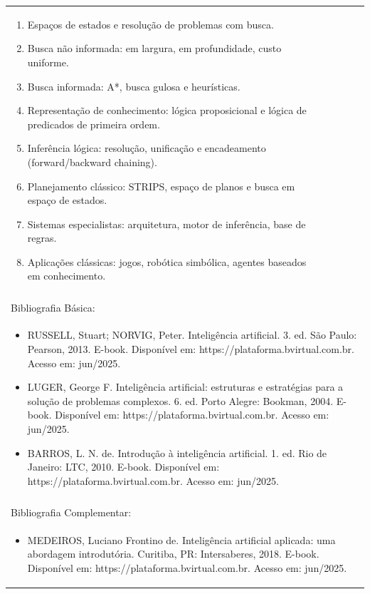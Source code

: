 \documentclass[11pt]{article}
\begin{document}
\begin{center}
\begin{longtable}{|p{4cm}|p{4cm}|p{4cm}|p{4cm}|}
{\begin{enumerate}
\item Espaços de estados e resolução de problemas com busca.
\item Busca não informada: em largura, em profundidade, custo uniforme.
\item Busca informada: A*, busca gulosa e heurísticas.
\item Representação de conhecimento: lógica proposicional e lógica de predicados de primeira ordem.
\item Inferência lógica: resolução, unificação e encadeamento (forward/backward chaining).
\item Planejamento clássico: STRIPS, espaço de planos e busca em espaço de estados.
\item Sistemas especialistas: arquitetura, motor de inferência, base de regras.
\item Aplicações clássicas: jogos, robótica simbólica, agentes baseados em conhecimento.\end{enumerate}}\\
\multicolumn{4}{|p{16cm}|}{}\\
\hline
\multicolumn{4}{|p{16cm}|}{Bibliografia Básica:}\\
\multicolumn{4}{|p{\dimexpr 16cm + 6\tabcolsep\relax}|}{%
\begin{itemize}\item RUSSELL, Stuart; NORVIG, Peter. Inteligência artificial. 3. ed. São Paulo: Pearson, 2013. E-book. Disponível em: https://plataforma.bvirtual.com.br. Acesso em: jun/2025.
\item LUGER, George F. Inteligência artificial: estruturas e estratégias para a solução de problemas complexos. 6. ed. Porto Alegre: Bookman, 2004. E-book. Disponível em: https://plataforma.bvirtual.com.br. Acesso em: jun/2025.
\item BARROS, L. N. de. Introdução à inteligência artificial. 1. ed. Rio de Janeiro: LTC, 2010. E-book. Disponível em: https://plataforma.bvirtual.com.br. Acesso em: jun/2025.\end{itemize}}\\
\multicolumn{4}{|p{16cm}|}{}\\
\hline
\multicolumn{4}{|p{16cm}|}{Bibliografia Complementar:}\\
\multicolumn{4}{|p{\dimexpr 16cm + 6\tabcolsep\relax}|}{%
\begin{itemize}\item MEDEIROS, Luciano Frontino de. Inteligência artificial aplicada: uma abordagem introdutória. Curitiba, PR: Intersaberes, 2018. E-book. Disponível em: https://plataforma.bvirtual.com.br. Acesso em: jun/2025.

\end{itemize}}
\end{longtable}
\end{center}
\end{document}
